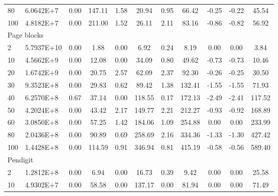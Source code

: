 {\begin{longtable}{@{}llccccccccc@{}}
80  & 6.0642E+7  & 0.00        & 147.11        & 1.58      & 20.94        & 0.95      & 66.42       & -0.25     & -0.22     & 45.54   \\
100 & 4.8182E+7  & 0.00        & 211.00        & 1.52      & 26.11        & 2.11      & 83.16       & -0.86     & -0.82     & 56.92   \\
\multicolumn{11}{l}{Page blocks}                                                                                                      \\
2   & 5.7937E+10 & 0.00        & 1.88          & 0.00      & 6.92         & 0.24      & 8.19        & 0.00      & 0.00      & 3.84    \\
10  & 4.5662E+9  & 0.00        & 12.08         & 0.00      & 34.09        & 0.80      & 49.62       & -0.73     & -0.73     & 10.46   \\
20  & 1.6742E+9  & 0.00        & 20.75         & 2.57      & 62.09        & 2.37      & 92.30       & -0.26     & -0.25     & 30.50   \\
30  & 9.3523E+8  & 0.00        & 29.83         & 0.62      & 89.42        & 1.38      & 132.41      & -1.55     & -1.55     & 71.93   \\
40  & 6.2570E+8  & 0.67        & 37.14         & 0.00      & 118.55       & 0.17      & 172.13      & -2.49     & -2.41     & 117.52  \\
50  & 4.2024E+8  & 0.00        & 43.42         & 2.17      & 149.77       & 2.21      & 212.27      & -0.93     & -0.92     & 168.89  \\
60  & 3.0850E+8  & 0.00        & 57.25         & 1.42      & 184.06       & 1.09      & 254.88      & 0.00      & 0.00      & 233.99  \\
80  & 2.0436E+8  & 0.00        & 90.89         & 0.69      & 258.69       & 2.16      & 334.36      & -1.33     & -1.30     & 427.42  \\
100 & 1.4428E+8  & 0.00        & 114.59        & 0.91      & 346.94       & 0.81      & 415.19      & -0.58     & -0.56     & 589.40  \\
\multicolumn{11}{l}{Pendigit}                                                                                                         \\
2   & 1.2812E+8  & 0.00        & 6.94          & 0.00      & 16.73        & 0.39      & 9.42        & 0.00      & 0.00      & 25.58   \\
10  & 4.9302E+7  & 0.00        & 58.58         & 0.00      & 137.17       & 0.00      & 81.94       & 0.00      & 0.00      & 71.49   \\

\end{longtable}}
